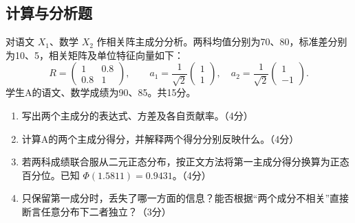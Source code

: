 \par\addvspace{6pt}\noindent\begin{minipage}{\linewidth}

\subsection{计算与分析题}


对语文 \(X_1\)、数学 \(X_2\) 作相关阵主成分分析。两科均值分别为70、80，标准差分别为10、5，相关矩阵及单位特征向量如下： \[R=\begin{pmatrix}1&0.8\\0.8&1\end{pmatrix},\qquad
a_1=\frac1{\sqrt2}\begin{pmatrix}1\\1\end{pmatrix},\quad
a_2=\frac1{\sqrt2}\begin{pmatrix}1\\-1\end{pmatrix}.\] 学生A的语文、数学成绩为90、85。共15分。

\begin{enumerate}
\def\labelenumi{\arabic{enumi}.}
\tightlist
\item
  写出两个主成分的表达式、方差及各自贡献率。（4分）
\item
  计算A的两个主成分得分，并解释两个得分分别反映什么。（4分）
\item
  若两科成绩联合服从二元正态分布，按正文方法将第一主成分得分换算为正态百分位。已知 \(\Phi(1.5811)=0.9431\)。（4分）
\item
  只保留第一成分时，丢失了哪一方面的信息？能否根据``两个成分不相关''直接断言任意分布下二者独立？（3分）
\end{enumerate}



\end{minipage}\par\vspace{4pt}

